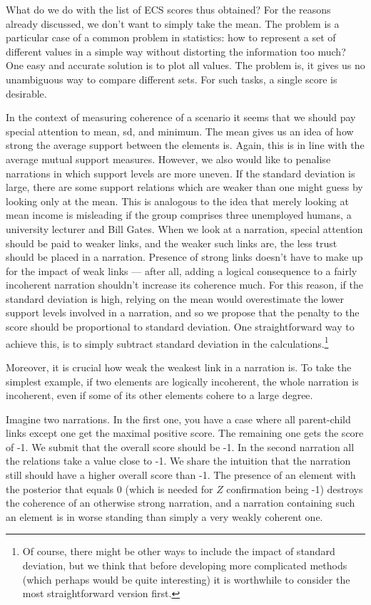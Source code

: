 \documentclass[10pt,]{scrartcl}
\newcommand{\s}[1]{\mbox{\textsf{#1}}}
\begin{document}
What do we do with the list of \textsf{ECS} scores thus obtained? For
the reasons already discussed, we don't want to simply take the mean.
The problem is a particular case of a common problem in statistics: how
to represent a set of different values in a simple way without
distorting the information too much? One easy and accurate solution is
to plot all values. The problem is, it gives us no unambiguous way to
compare different sets. For such tasks, a single score is desirable.

In the context of measuring coherence of a scenario it seems that we
should pay special attention to \s{mean}, \s{sd}, and \s{minimum}. The
mean gives us an idea of how strong the average support between the
elements is. Again, this is in line with the average mutual support
measures. However, we also would like to penalise narrations in which
support levels are more uneven. If the standard deviation is large,
there are some support relations which are weaker than one might guess
by looking only at the mean. This is analogous to the idea that merely
looking at mean income is misleading if the group comprises three
unemployed humans, a university lecturer and Bill Gates. When we look at
a narration, special attention should be paid to weaker links, and the
weaker such links are, the less trust should be placed in a narration.
Presence of strong links doesn't have to make up for the impact of weak
links --- after all, adding a logical consequence to a fairly incoherent
narration shouldn't increase its coherence much. For this reason, if the
standard deviation is high, relying on the mean would overestimate the
lower support levels involved in a narration, and so we propose that the
penalty to the score should be proportional to standard deviation. One
straightforward way to achieve this, is to simply subtract standard
deviation in the
calculations.\footnote{Of course, there might be other ways to include the impact of standard deviation, but we think that before developing more complicated methods (which perhaps would be quite interesting) it is worthwhile to  consider the most straightforward version first.}

Moreover, it is crucial how weak the weakest link in a narration is. To
take the simplest example, if two elements are logically incoherent, the
whole narration is incoherent, even if some of its other elements cohere
to a large degree.

Imagine two narrations. In the first one, you have a case where all
parent-child links except one get the maximal positive score. The
remaining one gets the score of -1. We submit that the overall score
should be -1. In the second narration all the relations take a value
close to -1. We share the intuition that the narration still should have
a higher overall score than -1. The presence of an element with the
posterior that equals 0 (which is needed for \(Z\) confirmation being
-1) destroys the coherence of an otherwise strong narration, and a
narration containing such an element is in worse standing than simply a
very weakly coherent one.
\end{document}
